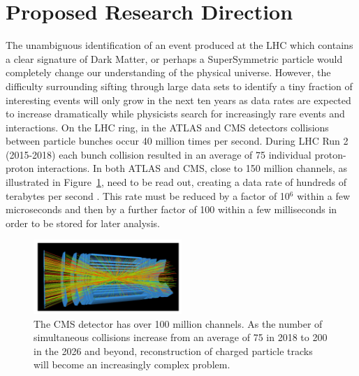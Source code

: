 \documentclass[preprint,12pt]{elsarticle}
\begin{document}
\section{Proposed Research Direction}
The unambiguous identification of an event produced at the 
LHC which contains a clear signature of Dark Matter, or perhaps 
a SuperSymmetric particle would completely change our understanding 
of the physical universe. However, the difficulty surrounding sifting through 
large data sets to identify a tiny fraction of interesting events 
will only grow in the next ten years as data rates are expected to 
increase dramatically while physicists search for increasingly rare 
events and interactions. On the LHC ring, in the ATLAS and CMS detectors 
collisions between particle bunches occur 40 million times per second. 
During LHC Run 2 (2015-2018) each bunch collision resulted in an average of 
75 individual proton-proton interactions. In both ATLAS and CMS, close 
to 150 million channels, as illustrated in Figure~\ref{fig:millionchannels}, need to be read out, 
creating a data rate of hundreds of terabytes per second \cite{RoadMapComputing, big_data_computing}. This rate must be 
reduced by a factor of 10$^{6}$ within a few microseconds and then 
by a further factor of 100 within a few milliseconds in order to be stored
for later analysis.
\begin{figure}[htbp]
\centering
     \includegraphics[trim=0 0 0 0,clip,width=0.5\textwidth]{MillionChannels.png}
     \caption{The CMS detector has over 100 million channels. As the number of simultaneous collisions increase from an average of 75 in 2018 to 200 in the 2026 and beyond, 
     reconstruction of charged particle tracks will become an increasingly complex problem.}
     \label{fig:millionchannels}
\end{figure}

\end{document}
